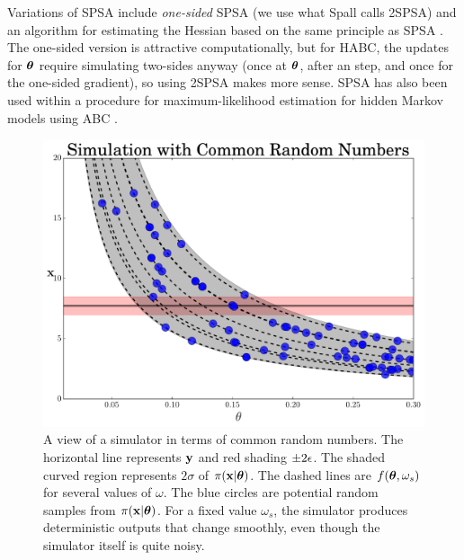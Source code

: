 \documentclass[]{article}
\begin{document}
Variations of SPSA include {\em one-sided} SPSA \cite{spall2000adaptive} (we use what Spall calls 2SPSA) and an algorithm for estimating the Hessian based on the same principle as SPSA \cite{spall2005monte}.   The one-sided version is attractive computationally, but for HABC, the updates for ${\bm \theta}$ require simulating two-sides anyway (once at ${\bm \theta}$, after an step, and once for the one-sided gradient), so using 2SPSA makes more sense.  SPSA has also been used within a procedure for maximum-likelihood estimation for hidden Markov models using ABC \cite{Ehrlich2013}.

\begin{figure}[t]
\vskip 0.2in
\begin{center}
\includegraphics[width=0.95\columnwidth]{./images/exp_crn_figure.pdf}
\caption{\small{A view of a simulator in terms of common random numbers.  The horizontal line represents ${\bf y}$ and red shading $\pm 2\epsilon$.  The shaded curved region represents $2\sigma$ of $\pi({\bf x}|{\bm \theta})$.  The dashed lines are $f({\bm \theta}, \omega_s)$ for several values of $\omega$.  The blue circles are potential random samples from $\pi({\bf x}|{\bm \theta})$.  For a fixed value $\omega_s$, the simulator produces deterministic outputs that change smoothly, even though the simulator itself is quite noisy.}}
\label{fig:exp-crns}
\end{center}
\vskip -0.2in
\end{figure} 
\end{document}
